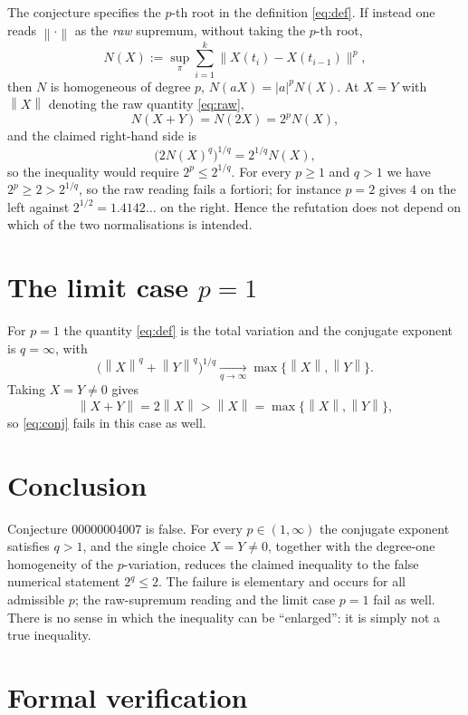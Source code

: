 \documentclass[11pt]{article}
\theoremstyle{definition}
\newcommand{\norm}[1]{\left\lVert #1 \right\rVert}
\begin{document}
The conjecture specifies the $p$-th root in the definition
\eqref{eq:def}.  If instead one reads $\norm{\cdot}$ as the \emph{raw}
supremum, without taking the $p$-th root,
\begin{equation}\label{eq:raw}
  N(X) := \sup_{\pi} \sum_{i=1}^{k}
          \bigl\lVert X(t_i) - X(t_{i-1}) \bigr\rVert^{p},
\end{equation}
then $N$ is homogeneous of degree $p$, $N(aX) = |a|^{p} N(X)$.  At $X = Y$
with $\norm{X}$ denoting the raw quantity \eqref{eq:raw},
\[
  N(X+Y) = N(2X) = 2^{p} N(X),
\]
and the claimed right-hand side is
\[
  \bigl(2 N(X)^{q}\bigr)^{1/q} = 2^{1/q} N(X),
\]
so the inequality would require $2^{p} \le 2^{1/q}$.  For every $p \ge 1$ and
$q > 1$ we have $2^{p} \ge 2 > 2^{1/q}$, so the raw reading fails a
fortiori; for instance $p = 2$ gives $4$ on the left against
$2^{1/2} = 1.4142\ldots$ on the right.  Hence the refutation does not depend
on which of the two normalisations is intended.

\section{The limit case $p = 1$}

For $p = 1$ the quantity \eqref{eq:def} is the total variation and the
conjugate exponent is $q = \infty$, with
\[
  \bigl(\norm{X}^{q} + \norm{Y}^{q}\bigr)^{1/q}
  \xrightarrow[q \to \infty]{} \max\{\norm{X}, \norm{Y}\}.
\]
Taking $X = Y \neq 0$ gives
\[
  \norm{X+Y} = 2\norm{X} > \norm{X} = \max\{\norm{X}, \norm{Y}\},
\]
so \eqref{eq:conj} fails in this case as well.

\section{Conclusion}

Conjecture 00000004007 is false.  For every $p \in (1,\infty)$ the
conjugate exponent satisfies $q > 1$, and the single choice $X = Y \neq 0$,
together with the degree-one homogeneity of the $p$-variation, reduces the
claimed inequality to the false numerical statement $2^{q} \le 2$.  The
failure is elementary and occurs for all admissible $p$; the raw-supremum
reading and the limit case $p = 1$ fail as well.  There is no sense in which
the inequality can be ``enlarged'': it is simply not a true inequality.

\section{Formal verification}
\end{document}
